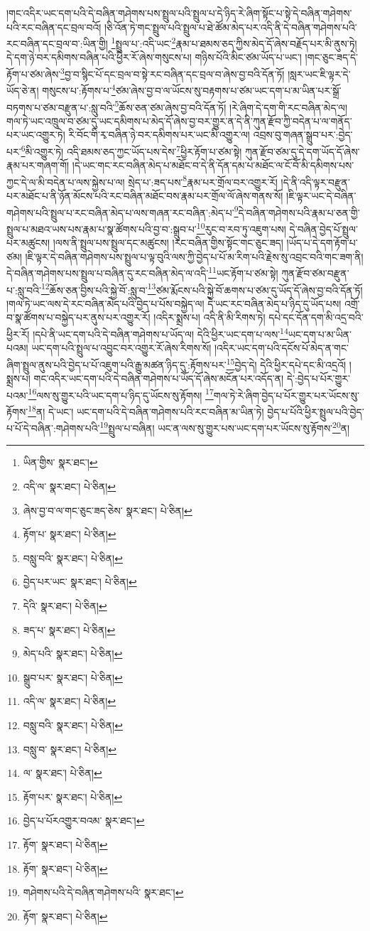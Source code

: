 །གང་འདིར་ཡང་དག་པའི་དེ་བཞིན་གཤེགས་པས་སྤྲུལ་པའི་སྤྲུལ་པ་དེ་ཉིད་རེ་ཞིག་སྟོང་པ་སྟེ་དེ་བཞིན་གཤེགས་པའི་རང་བཞིན་དང་བྲལ་བའོ། །ཅི་འོན་ཏེ་གང་སྤྲུལ་པའི་སྤྲུལ་པ་ཐེ་ཚོམ་མེད་པར་འདི་ནི་དེ་བཞིན་གཤེགས་པའི་རང་བཞིན་དང་བྲལ་བ་:ཡིན་གྱི། \footnote{ཡིན་གྱིས་  སྣར་ཐང་། }སྤྲུལ་པ་:འདི་ཡང་\footnote{འདི་ལ་  སྣར་ཐང་།  པེ་ཅིན། }རྣམ་པ་ཐམས་ཅད་ཀྱིས་མེད་དོ་ཞེས་བརྗོད་པར་མི་ནུས་ཏེ། དེ་དག་ཉེ་བར་དམིགས་བཞིན་པའི་ཕྱིར་རོ་ཞེས་གསུངས་པ། གཉིས་པོའི་མིང་ཙམ་ཡོད་པ་ཡང་། །གང་ཅུང་ཟད་དེ་རྟོག་པ་ཙམ་ཞེས་\footnote{ཞེས་བྱ་བ་ལ་གང་ཅུང་ཟད་ཅེས་  སྣར་ཐང་།  པེ་ཅིན། }བྱ་བ་སྙིང་པོ་དང་བྲལ་བ་སྟེ་རང་བཞིན་དང་བྲལ་བ་ཞེས་བྱ་བའི་དོན་ཏོ། །སླར་ཡང་ཇི་ལྟར་དེ་ཡོད་ཅེ་ན། གསུངས་པ་:རྟོགས་པ་\footnote{རྟོག་པ་  སྣར་ཐང་།  པེ་ཅིན། }ཙམ་ཞེས་བྱ་བ་ལ་ཡོངས་སུ་བརྟགས་པ་ཙམ་ཡང་དག་པ་མ་ཡིན་པར་སྒྲོ་བཏགས་པ་ཙམ་བརྫུན་པ་:སླུ་བའི་\footnote{བསླུ་བའི་  སྣར་ཐང་།  པེ་ཅིན། }ཆོས་ཅན་ཙམ་ཞེས་བྱ་བའི་དོན་ཏོ། །རེ་ཞིག་དེ་དག་གི་རང་བཞིན་མེད་ལ། གལ་ཏེ་ཡང་འཁྲུལ་བ་ཙམ་དུ་ཡང་དམིགས་པ་མེད་དོ་ཞེས་བྱ་བར་གྱུར་ན་དེ་ནི་ཀུན་རྫོབ་ཀྱི་བདེན་པ་ལ་གནོད་པར་ཡང་འགྱུར་ཏེ། རི་བོང་གི་རྭ་བཞིན་ཉེ་བར་དམིགས་པར་ཡང་མི་འགྱུར་ལ། འབྲས་བུ་གཞན་སྒྲུབ་པར་:བྱེད་པར་\footnote{བྱེད་པར་ཡང་  སྣར་ཐང་།  པེ་ཅིན། }མི་འགྱུར་ཏེ། འདི་ཐམས་ཅད་ཀྱང་ཡོད་པས་དེས་\footnote{དེའི་  སྣར་ཐང་།  པེ་ཅིན། }ཕྱིར་རྟོག་པ་ཙམ་སྟེ། ཀུན་རྫོབ་ཙམ་དུ་དེ་དག་ཡོད་དོ་ཞེས་རྣམ་པར་གཞག་གོ། །དེ་ཡང་གང་རང་བཞིན་མེད་པ་མཐོང་བ་དེ་ནི་དོན་དམ་པ་མཐོང་ལ་ངོ་བོ་མི་དམིགས་པས་ཀྱང་དེ་ལ་མི་བདེན་པ་ལས་སྐྱེས་པ་ལ། སྲེད་པ་:ཟད་པས་\footnote{ཟད་པ་  སྣར་ཐང་།  པེ་ཅིན། }རྣམ་པར་གྲོལ་བར་འགྱུར་རོ། །དེ་ནི་འདི་ལྟར་བརྫུན་པར་མཐོང་པ་ནི་ཉོན་མོངས་པའི་རང་བཞིན་མཐོང་བས་རྣམ་པར་གྲོལ་ལོ་ཞེས་གནས་སོ། །ཇི་ལྟར་ཡང་དེ་བཞིན་གཤེགས་པའི་སྤྲུལ་པ་རང་བཞིན་མེད་པ་ལས་གཞན་རང་བཞིན་:མེད་པ་\footnote{མེད་པའི་  སྣར་ཐང་།  པེ་ཅིན། }དེ་བཞིན་གཤེགས་པའི་རྣམ་པ་ཅན་གྱི་སྤྲུལ་པ་མཐའ་ཡས་པས་རྣམ་པ་སྣ་ཚོགས་པའི་བྱ་བ་:སྒྲུབ་པ་\footnote{སྒྲུབ་པར་  སྣར་ཐང་།  པེ་ཅིན། }རུང་བ་རབ་ཏུ་འཇུག་པས། དེ་བཞིན་བྱེད་པོ་སྤྲུལ་པར་མཚུངས། །ལས་ནི་སྤྲུལ་པས་སྤྲུལ་དང་མཚུངས། །རང་བཞིན་གྱིས་སྟོང་གང་ཅུང་ཟད། །ཡོད་པ་དེ་དག་རྟོག་པ་ཙམ། །ཇི་ལྟར་དེ་བཞིན་གཤེགས་པས་སྤྲུལ་པ་ལྟ་བུའི་ལས་ཀྱི་བྱེད་པ་པོ་མ་རིག་པའི་རྗེས་སུ་འབྲང་བའི་གང་ཟག་ནི། དེ་བཞིན་གཤེགས་པས་སྤྲུལ་པ་བཞིན་དུ་རང་བཞིན་མེད་ལ་འདི་\footnote{འདི་ལ་  སྣར་ཐང་།  པེ་ཅིན། }ཡང་རྟོག་པ་ཙམ་སྟེ། ཀུན་རྫོབ་ཙམ་བརྫུན་པ་:སླུ་བའི་\footnote{བསླུ་བའི་  སྣར་ཐང་།  པེ་ཅིན། }ཆོས་ཅན་བྱིས་པའི་སྐྱེ་བོ་:སླུ་བ་\footnote{བསླུ་བ་  སྣར་ཐང་།  པེ་ཅིན། }ཙམ་རྨོངས་པའི་སྐྱེ་བོ་ཆགས་པ་ཙམ་དུ་ཡོད་དོ་ཞེས་བྱ་བའི་དོན་ཏོ། །གལ་ཏེ་ཡང་ལས་དེ་རང་བཞིན་མེད་པའི་བྱེད་པ་པོས་བསྐྱེད་ལ། དེ་ཡང་རང་བཞིན་མེད་པ་ཉིད་དུ་ཡོད་པས། འགྲོ་བ་སྣ་ཚོགས་པ་བསྐྱེད་པར་ནུས་པར་འགྱུར་རོ། །འདིར་སྨྲས་པ། འདི་ནི་མི་རིགས་ཏེ། དཔེ་དང་དོན་དག་མི་འདྲ་བའི་ཕྱིར་རོ། །དཔེ་ནི་ཡང་དག་པའི་དེ་བཞིན་གཤེགས་པ་ཡོད་ལ། དེའི་ཕྱིར་ཡང་དག་པ་ལས་\footnote{ལ་  སྣར་ཐང་།  པེ་ཅིན། }ཡང་དག་པ་མ་ཡིན་པའམ། ཡང་དག་པའི་སྤྲུལ་པ་འབྱུང་བར་འགྱུར་རོ་ཞེས་རིགས་སོ། །འདིར་ཡང་དག་པའི་དངོས་པོ་མེད་ན་གང་ཞིག་སྤྲུལ་ནུས་པའི་བྱེད་པ་པོ་འཇུག་པའི་རྒྱུ་མཚན་ཉིད་དུ་:རྟོགས་པར་\footnote{རྟོག་པར་  སྣར་ཐང་།  པེ་ཅིན། }བྱེད་དེ། དེའི་ཕྱིར་དཔེ་དང་མི་འདྲའོ། །སྨྲས་པ། གང་འདིར་ཡང་དག་པའི་དེ་བཞིན་གཤེགས་པ་ཡོད་དོ་ཞེས་མངོན་པར་འདོད་ན། དེ་:བྱེད་པ་པོར་གྱུར་པའམ་\footnote{བྱེད་པ་པོརའགྱུར་བའམ་  སྣར་ཐང་། }ལས་སུ་གྱུར་པའི་ཡང་དག་པ་ཉིད་དུ་ཡོངས་སུ་རྟོགས། \footnote{རྟོག་  སྣར་ཐང་།  པེ་ཅིན། }གལ་ཏེ་རེ་ཞིག་བྱེད་པ་པོར་གྱུར་པར་ཡོངས་སུ་རྟོགས་\footnote{རྟོག་  སྣར་ཐང་།  པེ་ཅིན། }ན། དེ་ཡང་། ཡང་དག་པའི་དེ་བཞིན་གཤེགས་པའི་རང་བཞིན་མ་ཡིན་ཏེ། བྱེད་པ་པོའི་ཕྱིར་སྤྲུལ་པའི་བྱེད་པ་པོ་དེ་བཞིན་:གཤེགས་པའི་\footnote{གཤེགས་པའི་དེ་བཞིན་གཤེགས་པའི་  སྣར་ཐང་། }སྤྲུལ་པ་བཞིན། ཡང་ན་ལས་སུ་གྱུར་པས་ཡང་དག་པར་ཡོངས་སུ་རྟོགས་\footnote{རྟོག་  སྣར་ཐང་།  པེ་ཅིན། }ན། 